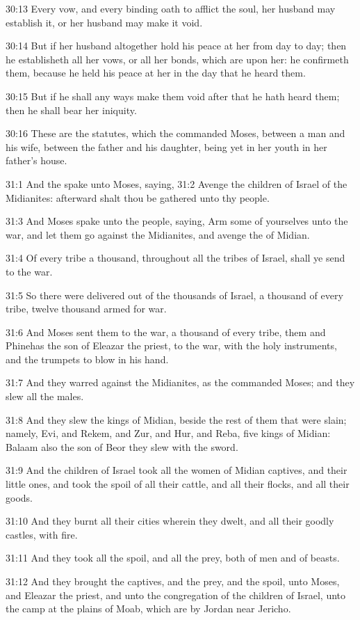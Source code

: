30:13 Every vow, and every binding oath to afflict the soul, her
husband may establish it, or her husband may make it void.

30:14 But if her husband altogether hold his peace at her from day to
day; then he establisheth all her vows, or all her bonds, which are
upon her: he confirmeth them, because he held his peace at her in the
day that he heard them.

30:15 But if he shall any ways make them void after that he hath heard
them; then he shall bear her iniquity.

30:16 These are the statutes, which the \LORD commanded Moses, between
a man and his wife, between the father and his daughter, being yet in
her youth in her father's house.

31:1 And the \LORD spake unto Moses, saying, 31:2 Avenge the children
of Israel of the Midianites: afterward shalt thou be gathered unto thy
people.

31:3 And Moses spake unto the people, saying, Arm some of yourselves
unto the war, and let them go against the Midianites, and avenge the
\LORD of Midian.

31:4 Of every tribe a thousand, throughout all the tribes of Israel,
shall ye send to the war.

31:5 So there were delivered out of the thousands of Israel, a
thousand of every tribe, twelve thousand armed for war.

31:6 And Moses sent them to the war, a thousand of every tribe, them
and Phinehas the son of Eleazar the priest, to the war, with the holy
instruments, and the trumpets to blow in his hand.

31:7 And they warred against the Midianites, as the \LORD commanded
Moses; and they slew all the males.

31:8 And they slew the kings of Midian, beside the rest of them that
were slain; namely, Evi, and Rekem, and Zur, and Hur, and Reba, five
kings of Midian: Balaam also the son of Beor they slew with the sword.

31:9 And the children of Israel took all the women of Midian captives,
and their little ones, and took the spoil of all their cattle, and all
their flocks, and all their goods.

31:10 And they burnt all their cities wherein they dwelt, and all
their goodly castles, with fire.

31:11 And they took all the spoil, and all the prey, both of men and
of beasts.

31:12 And they brought the captives, and the prey, and the spoil, unto
Moses, and Eleazar the priest, and unto the congregation of the
children of Israel, unto the camp at the plains of Moab, which are by
Jordan near Jericho.

